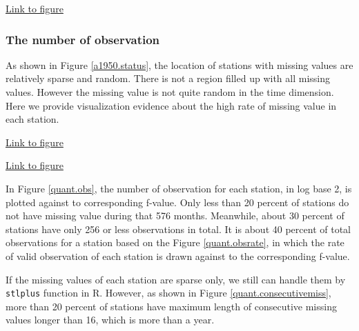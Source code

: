 \begin{framed}
\begin{center}
  \href{../plots/elev.dist.bycell.pdf}{Link to figure}
  \label{elev.dist.bycell}
\end{center}
\end{framed}

\subsubsection{The number of observation}

As shown in Figure \href{../plots/tmax.a1950.status.pdf}{\ref*{a1950.status}},
the location of stations with missing values are relatively sparse and random.
There is not a region filled up with all missing values. However the missing
value is not quite random in the time dimension. Here we provide visualization 
evidence about the high rate of missing value in each station.

\begin{framed}
\begin{center}
  \href{../plots/a1950/a1950.obs.station.pdf}{Link to figure}
  \label{quant.obs}
\end{center}
\end{framed}

\begin{framed}
\begin{center}
  \href{../plots/a1950/a1950.obsrate.station.pdf}{Link to figure}
  \label{quant.obsrate}
\end{center}
\end{framed}

In Figure \href{../plots/a1950/a1950.obs.station.pdf}{\ref*{quant.obs}}, the 
number of observation for each station, in log base 2, is plotted against to 
corresponding f-value. Only less than 20 percent of stations do not have missing
value during that 576 months. Meanwhile, about 30 percent of stations have only
256 or less observations in total. It is about 40 percent of total observations 
for a station based on the Figure 
\href{../plots/a1950/a1950.obsrate.station.pdf}{\ref*{quant.obsrate}}, in which 
the rate of valid observation of each station is drawn against to the 
corresponding f-value.

If the missing values of each station are sparse only, we still can handle them 
by \texttt{stlplus} function in R. However, as shown in Figure 
\href{../plots/a1950/a1950.consecutive.miss.station.pdf}
{\ref*{quant.consecutivemiss}}, more than 20 percent of stations have maximum 
length of consecutive missing values longer than 16, which is more than a year. 


